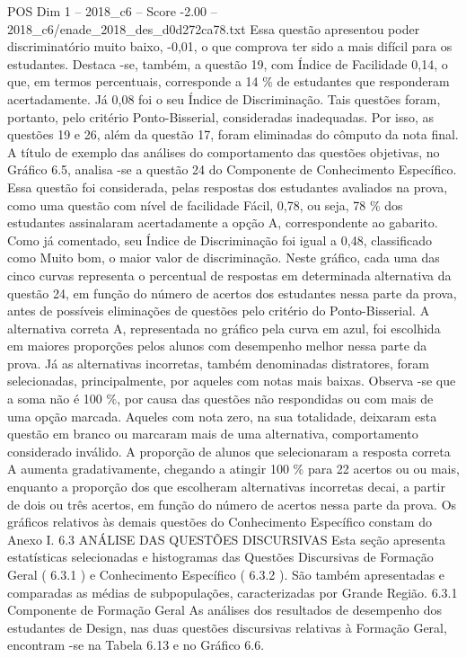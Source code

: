 \begin{textsample}{POS Dim 1 – 2018\_c6 – Score -2.00 – 2018\_c6/enade\_2018\_des\_d0d272ca78.txt}
Essa questão apresentou poder discriminatório muito baixo, -0,01, o que comprova ter sido a mais difícil para os estudantes.
Destaca -se, também, a questão 19, com Índice de Facilidade 0,14, o que, em termos percentuais, corresponde a 14 \% de estudantes que responderam acertadamente.
Já 0,08 foi o seu Índice de Discriminação.
Tais questões foram, portanto, pelo critério Ponto-Bisserial, consideradas inadequadas.
Por isso, as questões 19 e 26, além da questão 17, foram eliminadas do cômputo da nota final.
A título de exemplo das análises do comportamento das questões objetivas, no Gráfico 6.5, analisa -se a questão 24 do Componente de Conhecimento Específico.
Essa questão foi considerada, pelas respostas dos estudantes avaliados na prova, como uma questão com nível de facilidade Fácil, 0,78, ou seja, 78 \% dos estudantes assinalaram acertadamente a opção A, correspondente ao gabarito.
Como já comentado, seu Índice de Discriminação foi igual a 0,48, classificado como Muito bom, o maior valor de discriminação.
Neste gráfico, cada uma das cinco curvas representa o percentual de respostas em determinada alternativa da questão 24, em função do número de acertos dos estudantes nessa parte da prova, antes de possíveis eliminações de questões pelo critério do Ponto-Bisserial.
A alternativa correta A, representada no gráfico pela curva em azul, foi escolhida em maiores proporções pelos alunos com desempenho melhor nessa parte da prova.
Já as alternativas incorretas, também denominadas distratores, foram selecionadas, principalmente, por aqueles com notas mais baixas.
Observa -se que a soma não é 100 \%, por causa das questões não respondidas ou com mais de uma opção marcada.
Aqueles com nota zero, na sua totalidade, deixaram esta questão em branco ou marcaram mais de uma alternativa, comportamento considerado inválido.
A proporção de alunos que selecionaram a resposta correta A aumenta gradativamente, chegando a atingir 100 \% para 22 acertos ou ou mais, enquanto a proporção dos que escolheram alternativas incorretas decai, a partir de dois ou três acertos, em função do número de acertos nessa parte da prova.
Os gráficos relativos às demais questões do Conhecimento Específico constam do Anexo I. 6.3 ANÁLISE DAS QUESTÕES DISCURSIVAS Esta seção apresenta estatísticas selecionadas e histogramas das Questões Discursivas de Formação Geral ( 6.3.1 ) e Conhecimento Específico ( 6.3.2 ).
São também apresentadas e comparadas as médias de subpopulações, caracterizadas por Grande Região. 6.3.1 Componente de Formação Geral As análises dos resultados de desempenho dos estudantes de Design, nas duas questões discursivas relativas à Formação Geral, encontram -se na Tabela 6.13 e no Gráfico 6.6.

\end{textsample}
